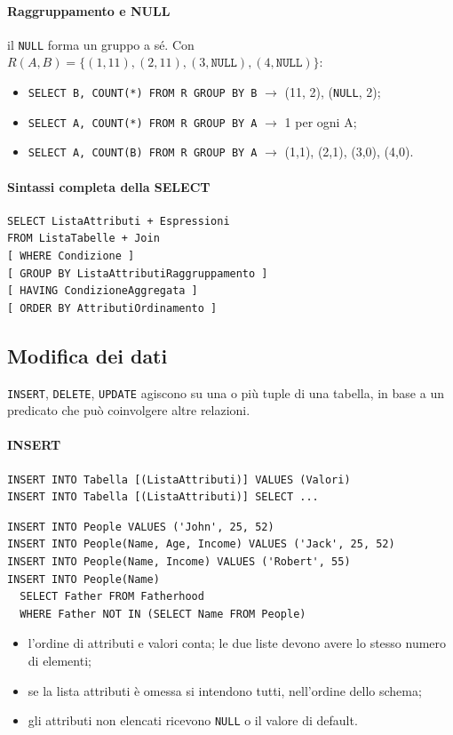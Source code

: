 \documentclass[a4paper,12pt]{article}
\begin{document}
\paragraph{Raggruppamento e NULL} il \texttt{NULL} forma un gruppo a sé. Con
$R(A,B) = \{(1,11),(2,11),(3,\texttt{NULL}),(4,\texttt{NULL})\}$:
\begin{itemize}
  \item \texttt{SELECT B, COUNT(*) FROM R GROUP BY B} $\to$ (11, 2),
    (\texttt{NULL}, 2);
  \item \texttt{SELECT A, COUNT(*) FROM R GROUP BY A} $\to$ 1 per ogni A;
  \item \texttt{SELECT A, COUNT(B) FROM R GROUP BY A} $\to$ (1,1), (2,1),
    (3,0), (4,0).
\end{itemize}

\paragraph{Sintassi completa della SELECT}
\begin{verbatim}
SELECT ListaAttributi + Espressioni
FROM ListaTabelle + Join
[ WHERE Condizione ]
[ GROUP BY ListaAttributiRaggruppamento ]
[ HAVING CondizioneAggregata ]
[ ORDER BY AttributiOrdinamento ]
\end{verbatim}

\subsection{Modifica dei dati}

\texttt{INSERT}, \texttt{DELETE}, \texttt{UPDATE} agiscono su una o più tuple
di una tabella, in base a un predicato che può coinvolgere altre relazioni.

\paragraph{INSERT}
\begin{verbatim}
INSERT INTO Tabella [(ListaAttributi)] VALUES (Valori)
INSERT INTO Tabella [(ListaAttributi)] SELECT ...
\end{verbatim}
\begin{verbatim}
INSERT INTO People VALUES ('John', 25, 52)
INSERT INTO People(Name, Age, Income) VALUES ('Jack', 25, 52)
INSERT INTO People(Name, Income) VALUES ('Robert', 55)
INSERT INTO People(Name)
  SELECT Father FROM Fatherhood
  WHERE Father NOT IN (SELECT Name FROM People)
\end{verbatim}
\begin{itemize}
  \item l'ordine di attributi e valori conta; le due liste devono avere lo
    stesso numero di elementi;
  \item se la lista attributi è omessa si intendono tutti, nell'ordine dello
    schema;
  \item gli attributi non elencati ricevono \texttt{NULL} o il valore di
    default.
\end{itemize}
\end{document}
